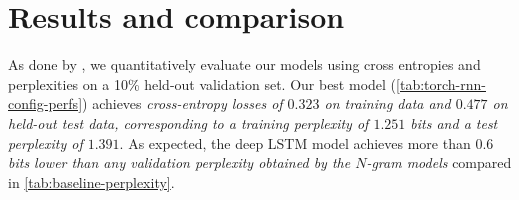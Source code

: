 \section{Results and comparison}

As done by \citep{bayer2013fast,Boulanger-Lewandowski2012}, we quantitatively
evaluate our models using cross entropies and perplexities on a 10\% held-out
validation set. Our best model (\vref{tab:torch-rnn-config-perfs}) achieves
\emph{cross-entropy losses of $0.323$ on training data and $0.477$ on held-out test
data, corresponding to a training perplexity of $1.251$ bits and a test
perplexity of $1.391$}. As expected, the deep LSTM model achieves more than
\emph{$0.6$ bits lower than any validation perplexity obtained by the $N$-gram
models} compared in \vref{tab:baseline-perplexity}.


